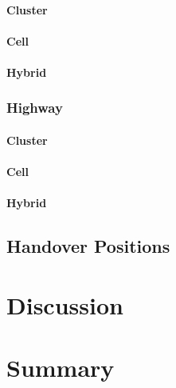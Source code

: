 \documentclass[master,english]{hgbthesis}
\begin{document}
\subsubsection{Cluster}

\subsubsection{Cell}

\subsubsection{Hybrid}

\subsection{Highway}

\subsubsection{Cluster}

\subsubsection{Cell}

\subsubsection{Hybrid}

\section{Handover Positions}%



\chapter{Discussion}%



\chapter{Summary}%





\MakeBibliography
\end{document}
